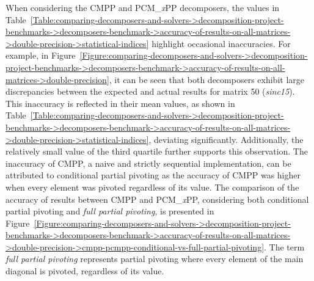 When considering the CMPP and PCM\_\textit{x}PP decomposers, the values in Table~\ref{Table:comparing-decomposers-and-solvers->decomposition-project-benchmarks->decomposers-benchmark->accuracy-of-results-on-all-matrices->double-precision->statistical-indices} highlight occasional inaccuracies.
For example, in Figure~\ref{Figure:comparing-decomposers-and-solvers->decomposition-project-benchmarks->decomposers-benchmark->accuracy-of-results-on-all-matrices->double-precision}, it can be seen that both decomposers exhibit large discrepancies between the expected and actual results for matrix 50 (\textit{sinc15}).
This inaccuracy is reflected in their mean values, as shown in Table~\ref{Table:comparing-decomposers-and-solvers->decomposition-project-benchmarks->decomposers-benchmark->accuracy-of-results-on-all-matrices->double-precision->statistical-indices}, deviating significantly.
Additionally, the relatively small value of the third quartile further supports this observation.
The inaccuracy of CMPP, a naive and strictly sequential implementation, can be attributed to conditional partial pivoting as the accuracy of CMPP was higher when every element was pivoted regardless of its value.
The comparison of the accuracy of results between CMPP and PCM\_\textit{x}PP, considering both conditional partial pivoting and \textit{full partial pivoting}, is presented in Figure~\ref{Figure:comparing-decomposers-and-solvers->decomposition-project-benchmarks->decomposers-benchmark->accuracy-of-results-on-all-matrices->double-precision->cmpp-pcmpp-conditional-vs-full-partial-pivoting}.
The term \textit{full partial pivoting} represents partial pivoting where every element of the main diagonal is pivoted, regardless of its value.

